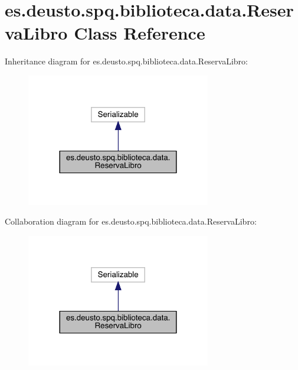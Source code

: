 \hypertarget{classes_1_1deusto_1_1spq_1_1biblioteca_1_1data_1_1_reserva_libro}{}\section{es.\+deusto.\+spq.\+biblioteca.\+data.\+Reserva\+Libro Class Reference}
\label{classes_1_1deusto_1_1spq_1_1biblioteca_1_1data_1_1_reserva_libro}


Inheritance diagram for es.\+deusto.\+spq.\+biblioteca.\+data.\+Reserva\+Libro\+:
\nopagebreak
\begin{figure}[H]
\begin{center}
\leavevmode
\includegraphics[width=228pt]{classes_1_1deusto_1_1spq_1_1biblioteca_1_1data_1_1_reserva_libro__inherit__graph}
\end{center}
\end{figure}


Collaboration diagram for es.\+deusto.\+spq.\+biblioteca.\+data.\+Reserva\+Libro\+:
\nopagebreak
\begin{figure}[H]
\begin{center}
\leavevmode
\includegraphics[width=228pt]{classes_1_1deusto_1_1spq_1_1biblioteca_1_1data_1_1_reserva_libro__coll__graph}
\end{center}
\end{figure}
